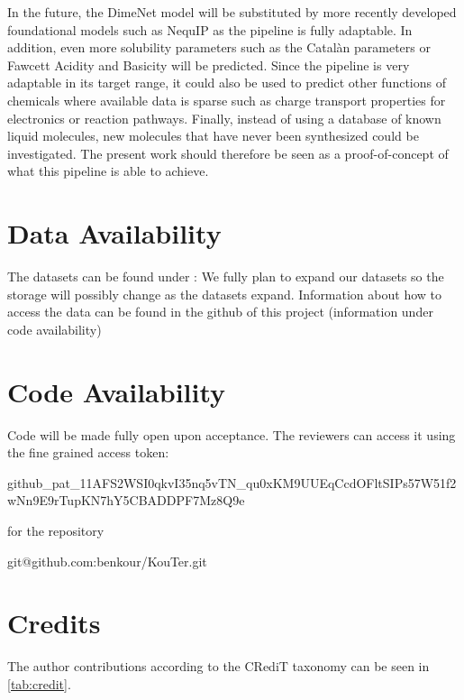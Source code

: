 \documentclass[
  english,        %
  font=times,     %
  onecolumn,      %
]{article}
\begin{document}
In the future, the DimeNet model will be substituted by more recently developed foundational models such as NequIP as the pipeline is fully adaptable. In addition, even more solubility parameters such as the Catalàn parameters or Fawcett Acidity and Basicity will be predicted. Since the pipeline is very adaptable in its target range, it could also be used to predict other functions of chemicals where available data is sparse such as charge transport properties for electronics or reaction pathways. Finally, instead of using a database of known liquid molecules, new molecules that have never been synthesized could be investigated.  The present work should therefore be seen as a proof-of-concept of what this pipeline is able to achieve.



\section*{Data Availability}
The datasets can be found under :
We fully plan to expand our datasets so the storage will possibly change as the datasets expand. Information about how to access the data can be found  in the github of this project (information under code availability)
\section*{Code Availability}
Code will be made fully open upon acceptance. The reviewers can access it using the fine grained access token:

github\_pat\_11AFS2WSI0qkvI35nq5vTN\_qu0xKM9UUEqCcdOFltSIPs57W51f2wNn9E9rTupKN7hY5CBADDPF7Mz8Q9e

for the repository

git@github.com:benkour/KouTer.git



\section*{Credits}
The author contributions according to the CRediT taxonomy can be seen in \cref{tab:credit}.
\end{document}

